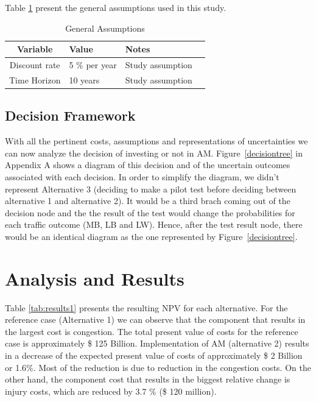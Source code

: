 \documentclass[11pt, letterpaper]{article}
\begin{document}
Table \ref{tab:assumptions} present the general assumptions used in this study.

\begin{table}[h]
\caption{General Assumptions}
\centering
\renewcommand{\arraystretch}{1.1}
\begin{tabular}{c l l l}
\hline
Variable 							& Value 				& Notes 			\\\hline\hline
Discount rate						& 5 \% per year			& Study assumption		\\
Time Horizon						& 10 years			& Study assumption		\\\hline
\end{tabular}
\label{tab:assumptions}
\end{table}%

\subsection{Decision Framework}

With all the pertinent costs, assumptions and representations of uncertainties we can now analyze
the decision of investing or not in AM.  Figure~\ref{decisiontree} in Appendix A shows a diagram of this decision and of the
uncertain outcomes associated with each decision. In order to simplify the diagram, we didn't represent
Alternative 3 (deciding to make a pilot test before deciding between alternative 1 and alternative 2). It would be a
third brach coming out of the decision node and the the result of the test would change the probabilities for each
traffic outcome (MB, LB and LW). Hence, after the test result node, there would be an identical diagram as the one represented
by Figure~\ref{decisiontree}.

\section{Analysis and Results} \label{results}

Table \ref{tab:results1} presents the resulting NPV for each alternative. For the reference case (Alternative 1) we can observe that the component that results in the largest cost is congestion. The total present value of costs for the reference case is approximately \$ 125 Billion. Implementation of AM (alternative 2) results in a decrease of the expected present value of costs of approximately \$ 2 Billion or 1.6\%. Most of the reduction is due to reduction in the congestion costs. On the other hand, the component cost that results in the biggest relative change is injury costs, which are reduced by 3.7 \% (\$ 120 million).
\end{document}
